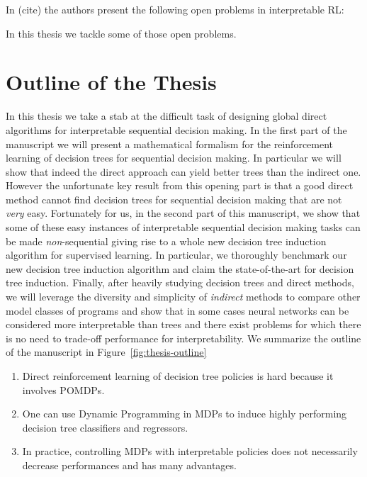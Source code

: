 In (cite) the authors present the following open problems in interpretable RL:

In this thesis we tackle some of those open problems.

\section{Outline of the Thesis}
In this thesis we take a stab at the difficult task of designing global direct algorithms for interpretable sequential decision making. In the first part of the manuscript we will present a mathematical formalism for the reinforcement learning of decision trees for sequential decision making. In particular we will show that indeed the direct approach can yield better trees than the indirect one. However the unfortunate key result from this opening part is that a good direct method cannot find decision trees for sequential decision making that are not \textit{very} easy.
Fortunately for us, in the second part of this manuscript, we show that some of these easy instances of interpretable sequential decision making tasks can be made \textit{non}-sequential giving rise to a whole new decision tree induction algorithm for supervised learning. In particular, we thoroughly benchmark our new decision tree induction algorithm and claim the state-of-the-art for decision tree induction.
Finally, after heavily studying decision trees and direct methods, we will leverage the diversity and simplicity of \textit{indirect} methods to compare other model classes of programs and show that in some cases neural networks can be considered more interpretable than trees and there exist problems for which there is no need to trade-off performance for interpretability. 
We summarize the outline of the manuscript in Figure~\ref{fig:thesis-outline} 

\begin{enumerate}
    \item Direct reinforcement learning of decision tree policies is hard because it involves POMDPs.
    \item One can use Dynamic Programming in MDPs to induce highly performing decision tree classifiers and regressors.
    \item In practice, controlling MDPs with interpretable policies does not necessarily decrease performances and has many advantages.
\end{enumerate}

